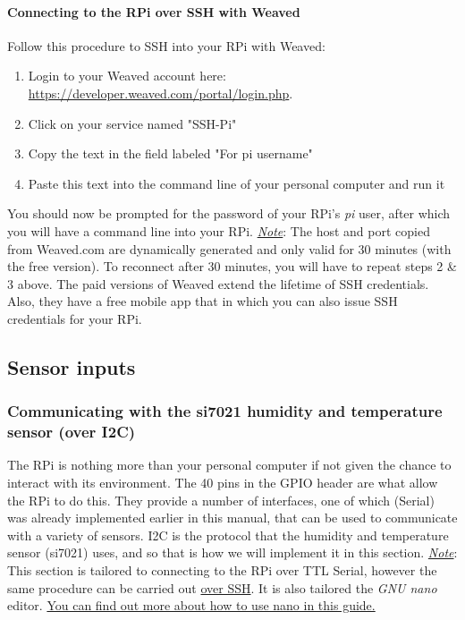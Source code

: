 \documentclass{article}
\newcommand{\note}[1]{\underline{\textit{Note}}: #1}
\begin{document}
    \paragraph{Connecting to the RPi over SSH with Weaved}
    Follow this procedure to SSH into your RPi with Weaved:
    \begin{enumerate}
      \item Login to your Weaved account here: \href{https://developer.weaved.com/portal/login.php}{https://developer.weaved.com/portal/login.php}.
      \item Click on your service named "SSH-Pi"
      \item Copy the text in the field labeled "For pi username"
      \item Paste this text into the command line of your personal computer and run it
    \end{enumerate}
    You should now be prompted for the password of your RPi's \textit{pi} user, after which you will have a command line into your RPi.
    \note{The host and port copied from Weaved.com are dynamically generated and only valid for 30 minutes (with the free version). To reconnect after 30 minutes, you will have to repeat steps 2 \& 3 above. The paid versions of Weaved extend the lifetime of SSH credentials. Also, they have a free mobile app that in which you can also issue SSH credentials for your RPi.}

\subsection{Sensor inputs}
    \subsubsection{Communicating with the si7021 humidity and temperature sensor (over I2C)}
  The RPi is nothing more than your personal computer if not given the chance to interact with its environment. The 40 pins in the GPIO header are what allow the RPi to do this. They provide a number of interfaces, one of which (Serial) was already implemented earlier in this manual, that can be used to communicate with a variety of sensors. I2C is the protocol that the humidity and temperature sensor (si7021) uses, and so that is how we will implement it in this section.
  \newline\newline\underline{\textit{Note}}: This section is tailored to connecting to the RPi over TTL Serial, however the same procedure can be carried out \hyperref[sec:connect-ssh]{over SSH}. It is also tailored the \textit{GNU nano} editor. \href{http://www.howtogeek.com/howto/42980/the-beginners-guide-to-nano-the-linux-command-line-text-editor/}{You can find out more about how to use nano in this guide.}
\end{document}
